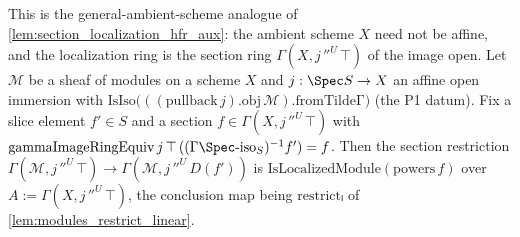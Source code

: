 \begin{lemma}
  \label{lem:section_localization_hfr_aux_general}
  This is the general-ambient-scheme analogue of \cref{lem:section_localization_hfr_aux}: the ambient
  scheme \(X\) need not be affine, and the localization ring is the section ring
  \(\Gamma(X, j\,''^{U}\,\top)\) of the image open.
  Let \(\mathcal{M}\) be a sheaf of modules on a scheme \(X\) and \(j : \Spec S \to X\) an affine open
  immersion with
  \(\mathrm{IsIso}\bigl(((\mathrm{pullback}\,j).\mathrm{obj}\,\mathcal{M}).\mathrm{fromTildeΓ}\bigr)\)
  (the P1 datum). Fix a slice element \(f' \in S\) and a section \(f \in \Gamma(X, j\,''^{U}\,\top)\) with
  \(\mathrm{gammaImageRingEquiv}\,j\,\top\,((\Gamma\Spec\text{-iso}_S)^{-1} f') = f\). Then the section
  restriction \(\Gamma(\mathcal{M}, j\,''^{U}\,\top) \to \Gamma(\mathcal{M}, j\,''^{U}\,D(f'))\) is
  \(\mathrm{IsLocalizedModule}(\mathrm{powers}\,f)\) over \(A := \Gamma(X, j\,''^{U}\,\top)\), the
  conclusion map being \(\mathrm{restrictₗ}\) of \cref{lem:modules_restrict_linear}.
\end{lemma}
